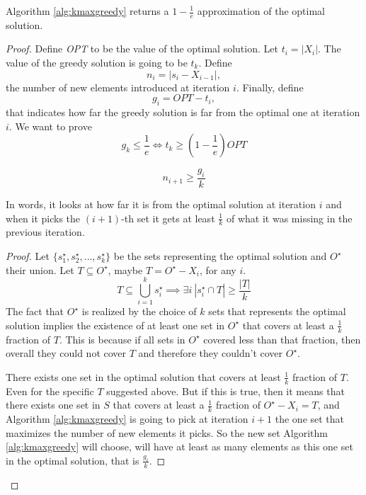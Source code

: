 \begin{thm}
	Algorithm \ref{alg:kmaxgreedy} returns a $1-\frac{1}{e}$ approximation of the optimal solution. 
\end{thm}
\begin{proof}
	Define \textit{OPT} to be the value of the optimal solution. Let $t_i = |X_i|$. The value of the greedy solution is going to be $t_k$. Define 
	\begin{equation}
	n_i = |s_i - X_{i-1}|,
	\end{equation} the number of new elements introduced at iteration $i$. Finally, define \begin{equation}
	g_i = OPT - t_i,
	\end{equation} that indicates how far the greedy solution is far from the optimal one at iteration $i$. We want to prove 
	\begin{equation}
	g_k \leq \frac{1}{e} \iff t_k \geq \left(1-\frac{1}{e}\right)\textit{OPT}
	\end{equation}
	\begin{lem}\label{lem1}
		\begin{equation}
		n_{i + 1} \geq \frac{g_i}{k}
		\end{equation}
	\end{lem}
	In words, it looks at how far it is from the optimal solution at iteration $i$ and when it picks the $(i+1)$-th set it gets at least $\frac{1}{k}$ of what it was missing in the previous iteration. 
	
	\begin{proof}
		Let $\{s_1^\star, s_2^\star, \ldots, s_k^\star\}$ be the sets representing the optimal solution and $O^\star$ their union. Let $T \subseteq O^\star$, maybe $T = O^\star - X_i$, for any $i$.
		\begin{equation}
		T \subseteq \bigcup_{i=1}^ks_i^\star \implies \exists i\ |s_i^\star \cap T| \geq \frac{|T|}{k}
		\end{equation}
		The fact that $O^\star$ is realized by the choice of $k$ sets that represents the optimal solution implies the existence of at least one set in $O^\star$ that covers at least a $\frac{1}{k}$ fraction of $T$. This is because if all sets in $O^\star$ covered less than that fraction, then overall they could not cover $T$ and therefore they couldn't cover $O^\star$.
		
		There exists one set in the optimal solution that covers at least $\frac{1}{k}$ fraction of $T$. Even for the specific $T$ suggested above. But if this is true, then it means that there exists one set in $S$ that covers at least a $\frac{1}{k}$ fraction of $O^\star - X_i = T$, and Algorithm \ref{alg:kmaxgreedy} is going to pick at iteration $i+1$ the one set that maximizes the number of new elements it picks. So the new set Algorithm \ref{alg:kmaxgreedy} will choose, will have at least as many elements as this one set in the optimal solution, that is $\frac{g_i}{k}$. 
	\end{proof}
	

\end{proof}
